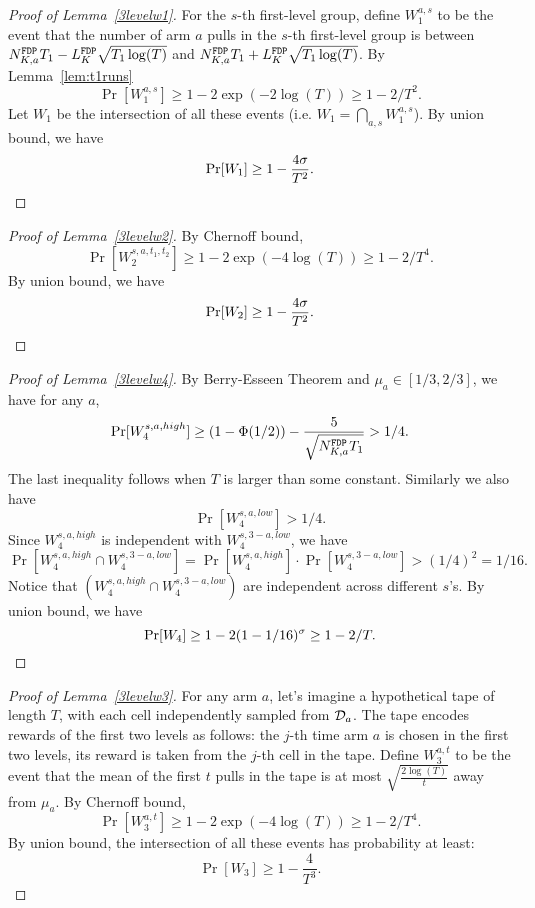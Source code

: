 \begin{proof}[Proof of Lemma~\ref{3levelw1}]
  For the $s$-th first-level group, define $W_1^{a,s}$ to be the event
  that the number of arm $a$ pulls in the $s$-th first-level group is
  between $N^\mathtt{FDP}_{K,a} T_1- L^\mathtt{FDP}_K \sqrt{T_1\log(T)}$ and
  $N^\mathtt{FDP}_{K,a} T_1 + L^\mathtt{FDP}_K \sqrt{T_1\log(T)}$. By Lemma~\ref{lem:t1runs}
\[
\Pr[W_1^{a,s}] \geq 1-2\exp(-2\log(T)) \geq 1-2/T^2.
\]
Let $W_1$  be the intersection of all these events (i.e.
$W_1 = \bigcap_{a,s}W_1^{a,s}$). By union bound, we have
\[
\Pr[W_1] \geq 1- \frac{4\sigma}{T^2}.
\]
\end{proof}



\begin{proof}[Proof of Lemma~\ref{3levelw2}]
  By Chernoff bound,
\[
\Pr[W_2^{s,a,t_1,t_2}] \geq 1 - 2\exp(-4\log(T)) \geq 1- 2/T^4.
\]
By union bound, we have
\[
\Pr[W_2] \geq 1- \frac{4\sigma}{T^2}.
\]
\end{proof}


\begin{proof}[Proof of Lemma~\ref{3levelw4}]
By Berry-Esseen Theorem and
  $\mu_a \in [1/3,2/3]$, we have for any $a$,
\[
\Pr[W_4^{s,a,high}] \geq (1-\Phi(1/2)) - \frac{5}{\sqrt{N^\mathtt{FDP}_{K,a} T_1}} > 1/4.
\]
The last inequality follows when $T$ is larger than some constant.
Similarly we also have
\[
\Pr[W_4^{s,a,low}] > 1/4.
\]
Since $W_4^{s,a,high}$ is independent with $W_4^{s,3-a,low}$, we have
\[
\Pr[W_4^{s,a,high} \cap W_4^{s,3-a,low}] =\Pr[W_4^{s,a,high}] \cdot  \Pr[W_4^{s,3-a,low}]>(1/4)^2 = 1/16.
\]
Notice that $(W_4^{s,a,high} \cap W_4^{s,3-a,low})$ are independent
across different $s$'s. By union bound, we have
\[
\Pr[W_4] \geq 1- 2(1-1/16)^\sigma \geq 1 -2 /T.
\]
\end{proof}



\begin{proof}[Proof of Lemma~\ref{3levelw3}]
  For any arm $a$, let's imagine a hypothetical tape of length $T$,
  with each cell independently sampled from $\mathcal{D}_a$. The tape encodes
  rewards of the first two levels as follows: the $j$-th time arm $a$
  is chosen in the first two levels, its reward is taken from the
  $j$-th cell in the tape. Define $W_3^{a,t}$ to be the event that the
  mean of the first $t$ pulls in the tape is at most
  $\sqrt{\frac{2\log(T)}{t}}$ away from $\mu_a$. By Chernoff bound,
\[
\Pr[W_3^{a,t}] \geq 1 - 2\exp(-4\log(T)) \geq 1- 2/T^4.
\]
By union bound, the intersection of all these events has probability
at least:
\[
\Pr[W_3] \geq 1- \frac{4}{T^3}.
\]
\end{proof}

